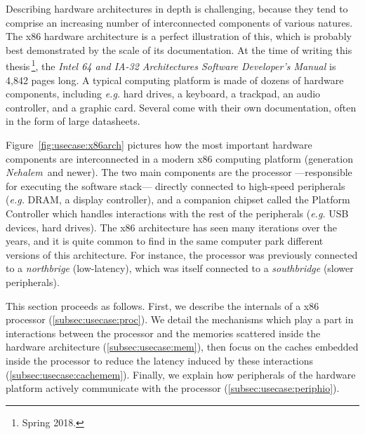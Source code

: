 Describing hardware architectures in depth is challenging, because they tend to
comprise an increasing number of interconnected components of various natures.
%
The x86 hardware architecture is a perfect illustration of this, which is
probably best demonstrated by the scale of its documentation.
%
At the time of writing this thesis\,\footnote{Spring 2018.}, the \emph{Intel 64
  and IA-32 Architectures Software Developer’s Manual} is 4,842 pages long.
%
A typical computing platform is made of dozens of hardware components, including
\emph{e.g.} hard drives, a keyboard, a trackpad, an audio controller, and a
graphic card.
%
Several come with their own documentation, often in the form of large
datasheets.

Figure~\ref{fig:usecase:x86arch} pictures how the most important hardware
components are interconnected in a modern x86 computing platform (generation
\emph{Nehalem}\,\cite{thomadakis2011nehalem} and newer).
%
The two main components are the processor ---responsible for executing the
software stack--- directly connected to high-speed peripherals (\emph{e.g.}
DRAM, a display controller), and a companion chipset called the Platform
Controller which handles interactions with the rest of the peripherals
(\emph{e.g.} USB devices, hard drives).
%
The x86 architecture has seen many iterations over the years, and it is quite
common to find in the same computer park different versions of this
architecture.
%
For instance, the processor was previously connected to a \emph{northbrige}
(low-latency), which was itself connected to a \emph{southbridge} (slower
peripherals).

This section proceeds as follows.
%
First, we describe the internals of a x86 processor (\ref{subsec:usecase:proc}).
%
We detail the mechanisms which play a part in interactions between the processor
and the memories scattered inside the hardware architecture
(\ref{subsec:usecase:mem}), then focus on the caches embedded inside the
processor to reduce the latency induced by these interactions
(\ref{subsec:usecase:cachemem}).
%
Finally, we explain how peripherals of the hardware platform actively
communicate with the processor (\ref{subsec:usecase:periphio}).

